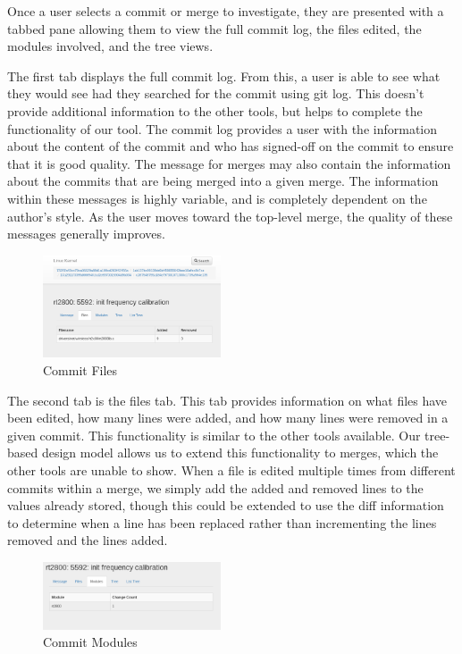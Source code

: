 \documentclass[conference, draftclsnofoot]{IEEEtran}
\begin{document}
Once a user selects a commit or merge to investigate, they are presented with a
tabbed pane allowing them to view the full commit log, the files edited, the modules
involved, and the tree views.

The first tab displays the full commit log. From this, a user is able to see what
they would see had they searched for the commit using git log. This doesn't provide
additional information to the other tools, but helps to complete the functionality
of our tool. The commit log provides a user with the information about the content
of the commit and who has signed-off on the commit to ensure that it is good
quality. The message for merges may also contain the information about the commits
that are being merged into a given merge. The information within these messages is
highly variable, and is completely dependent on the author's style. As the user
moves toward the top-level merge, the quality of these messages generally improves.

\begin{figure}
        \centering
        \includegraphics[width=0.47\textwidth]{figures/file_view.png}
        \caption{Commit Files}
        \label{fig:files}
\end{figure}

The second tab is the files tab. This tab provides information on what files have
been edited, how many lines were added, and how many lines were removed in a given
commit. This functionality is similar to the other tools available. Our tree-based
design model allows us to extend this functionality to merges, which the other tools
are unable to show. When a file is edited multiple times from different commits
within a merge, we simply add the added and removed lines to the values already
stored, though this could be extended to use the diff information to determine when
a line has been replaced rather than incrementing the lines removed and the lines
added.

\begin{figure}
        \centering
        \includegraphics[width=0.47\textwidth]{figures/modules.png}
        \caption{Commit Modules}
        \label{fig:modules}
\end{figure}
\end{document}
